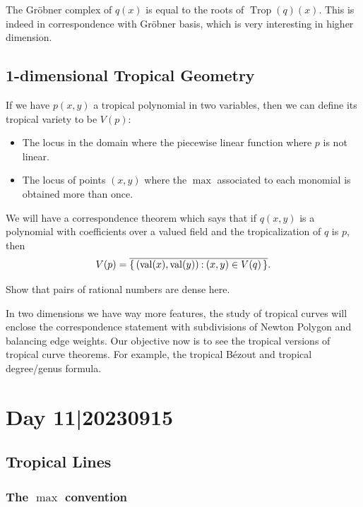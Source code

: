 \documentclass[12pt]{memoir}
\DeclareMathOperator{\val}{val}
\DeclareMathOperator{\Trop}{Trop}
\begin{document}
The Gr\"obner complex of $q(x)$ is equal to the roots of $\Trop(q)(x)$. This is indeed in correspondence with Gr\"obner basis, which is very interesting in higher dimension. 

\subsection{1-dimensional Tropical Geometry}

If we have $p(x,y)$ a tropical polynomial in two variables, then we can define its tropical variety to be $V(p)$:
\begin{itemize}
    \item The locus in the domain where the piecewise linear function where $p$ is not linear.
    \item The locus of points $(x,y)$ where the $\max$ associated to each monomial is obtained more than once.
\end{itemize}

We will have a correspondence theorem which says that if $q(x,y)$ is a polynomial with coefficients over a valued field and the tropicalization of $q$ is $p$, then 
$$V(p)=\ov{\set{(\val(x),\val(y))\: (x,y)\in V(q)}}.$$
\begin{Ej}
Show that pairs of rational numbers are dense here. 
\end{Ej}
In two dimensions we have way more features, the study of tropical curves will enclose the correspondence statement with subdivisions of Newton Polygon and balancing edge weights. Our objective now is to see the tropical versions of tropical curve theorems. For example, the tropical Bézout and tropical degree/genus formula.

\section{Day 11|20230915}

\subsection{Tropical Lines}

\subsubsection{The $\max$ convention}
\end{document}
